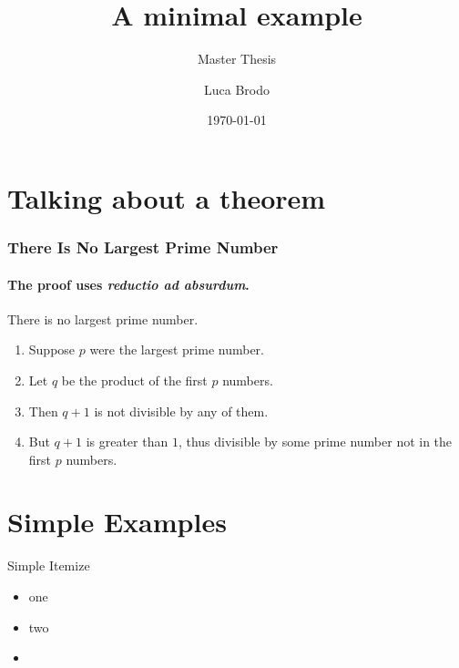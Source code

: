\documentclass{beamer}
\title{A minimal example}
\date{\today}
\author{Luca Brodo}
\subtitle{Master Thesis}
\begin{document}
\maketitle


\section[Theorem]{Talking about a theorem}
\begin{frame} 
\frametitle{There Is No Largest Prime Number} 
\framesubtitle{The proof uses \textit{reductio ad absurdum}.} 
\begin{theorem}
There is no largest prime number. \end{theorem} 
\begin{enumerate} 
\item<1-| alert@1> Suppose $p$ were the largest prime number. 
\item<2-> Let $q$ be the product of the first $p$ numbers. 
\item<3-> Then $q+1$ is not divisible by any of them. 
\item<1-> But $q + 1$ is greater than $1$, thus divisible by some prime
number not in the first $p$ numbers. 
\end{enumerate}
\end{frame}
\section{Simple Examples}
\begin{frame}{Simple Itemize}
\begin{itemize}
\item one
\item two
\item \inserttotalframenumber
\end{itemize}
\end{frame}




\end{document}
